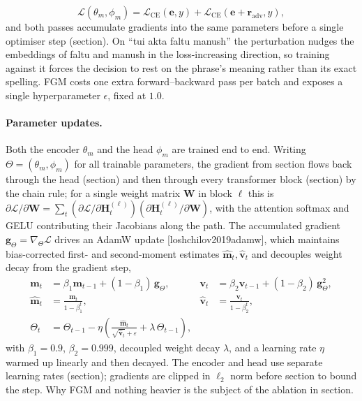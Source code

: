 \documentclass[11pt,a4paper]{article}
\def\citep#1{[#1]}%
\def\cref#1{section}%
\def\emph#1{#1}%
\begin{document}
\begin{equation}
\mathcal{L}(\theta_m, \phi_m) = \mathcal{L}_{\mathrm{CE}}(\mathbf{e}, y) + \mathcal{L}_{\mathrm{CE}}(\mathbf{e} + \mathbf{r}_{\mathrm{adv}}, y),
\label{eq:fgm-loss}
\end{equation}
and both passes accumulate gradients into the same parameters before a single optimiser step (\cref{alg:fgm}). On \emph{``tui akta faltu manush''} the perturbation nudges the embeddings of \emph{faltu} and \emph{manush} in the loss-increasing direction, so training against it forces the decision to rest on the phrase's meaning rather than its exact spelling. FGM costs one extra forward--backward pass per batch and exposes a single hyperparameter $\epsilon$, fixed at $1.0$.

\paragraph{Parameter updates.} Both the encoder $\theta_m$ and the head $\phi_m$ are trained end to end. Writing $\Theta = (\theta_m, \phi_m)$ for all trainable parameters, the gradient from \cref{eq:fgm-loss} flows back through the head (\cref{eq:head,eq:pool}) and then through every transformer block (\cref{eq:block,eq:mha,eq:attention}) by the chain rule; for a single weight matrix $\mathbf{W}$ in block $\ell$ this is $\partial \mathcal{L}/\partial \mathbf{W} = \sum_t (\partial \mathcal{L}/\partial \mathbf{H}^{(\ell)}_t)(\partial \mathbf{H}^{(\ell)}_t/\partial \mathbf{W})$, with the attention softmax and GELU contributing their Jacobians along the path. The accumulated gradient $\mathbf{g}_\Theta = \nabla_\Theta \mathcal{L}$ drives an AdamW update \citep{loshchilov2019adamw}, which maintains bias-corrected first- and second-moment estimates $\hat{\mathbf{m}}_t, \hat{\mathbf{v}}_t$ and decouples weight decay from the gradient step,
\begin{align}
\mathbf{m}_t &= \beta_1 \mathbf{m}_{t-1} + (1-\beta_1)\,\mathbf{g}_\Theta, &
\mathbf{v}_t &= \beta_2 \mathbf{v}_{t-1} + (1-\beta_2)\,\mathbf{g}_\Theta^{2}, \label{eq:adam-moments}\\[2pt]
\hat{\mathbf{m}}_t &= \frac{\mathbf{m}_t}{1-\beta_1^{t}}, &
\hat{\mathbf{v}}_t &= \frac{\mathbf{v}_t}{1-\beta_2^{t}}, \nonumber\\[2pt]
\Theta_{t} &= \Theta_{t-1} - \eta\left(\frac{\hat{\mathbf{m}}_t}{\sqrt{\hat{\mathbf{v}}_t} + \varepsilon} + \lambda\,\Theta_{t-1}\right), \label{eq:adamw-update}
\end{align}
with $\beta_1 = 0.9$, $\beta_2 = 0.999$, decoupled weight decay $\lambda$, and a learning rate $\eta$ warmed up linearly and then decayed. The encoder and head use separate learning rates (\cref{tab:hparams}); gradients are clipped in $\ell_2$ norm before \cref{eq:adamw-update} to bound the step. Why FGM and nothing heavier is the subject of the ablation in \cref{sec:ablation-results}.
\end{document}
